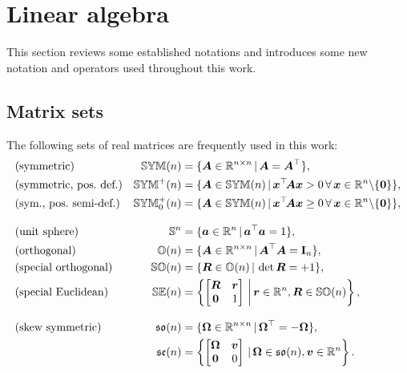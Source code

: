 \section{Linear algebra}
This section reviews some established notations and introduces some new notation and operators used throughout this work.

\subsection{Matrix sets}
The following sets of real matrices are frequently used in this work: 
\begin{subequations}
\begin{align}
 &\text{(symmetric)}&
 \SymMat(n) &= \{ \mat{A} \in \RealNum^{n\times n} \, | \, \mat{A} = \mat{A}^\top \},
\\
 &\text{(symmetric, pos.\ def.)}&
 \SymMatP(n) &= \{ \mat{A} \in \SymMat(n) \, | \, \tuple{x}^\top\! \mat{A} \tuple{x} > 0 \, \forall \, \tuple{x} \in \RealNum^{n} \backslash \{\tuple{0}\} \},
\\
 &\text{(sym., pos.\ semi-def.)}&
 \SymMatSP(n) &= \{ \mat{A} \in \SymMat(n) \, | \, \tuple{x}^\top\! \mat{A} \tuple{x} \geq 0 \, \forall \, \tuple{x} \in \RealNum^{n} \backslash \{\tuple{0}\} \},
\\[2ex]
 &\text{(unit sphere)}&
 \mathbb{S}^n &= \{ \tuple{a} \in \RealNum^{n} \, | \, \tuple{a}^\top\tuple{a} = 1 \},
\\
 &\text{(orthogonal)}&
 \mathbb{O}(n) &= \{ \mat{A} \in \RealNum^{n\times n} \, | \, \mat{A}^\top \mat{A} = \idMat[n] \},
\\
 &\text{(special orthogonal)}&
 \SpecialOrthogonalGroup(n) &= \{ \mat{R} \in \mathbb{O}(n) \, | \, \det\mat{R} = +1 \},
\\
 &\text{(special Euclidean)}&
 \SpecialEuclideanGroup(n) &= \left\{ \begin{bmatrix} \R & \r \\ \mat{0} & 1 \end{bmatrix} \, \bigg| \, \r \in \RealNum^n, \R \in \SpecialOrthogonalGroup(n) \right\},
\\[2ex]
 &\text{(skew symmetric)}&
 \SpecialOrthogonalAlgebra(n) &= \{ \mat{\Omega} \in \RealNum^{n\times n} \, | \, \mat{\Omega}^\top = -\mat{\Omega} \},
\\
 &\text{}&
 \SpecialEuclideanAlgebra(n) &= \left\{ \begin{bmatrix} \mat{\Omega} & \tuple{v} \\ \mat{0} & 0 \end{bmatrix} \, | \, \mat{\Omega} \in \SpecialOrthogonalAlgebra(n), \tuple{v} \in \RealNum^{n} \right\}.
\end{align} 
\end{subequations}

